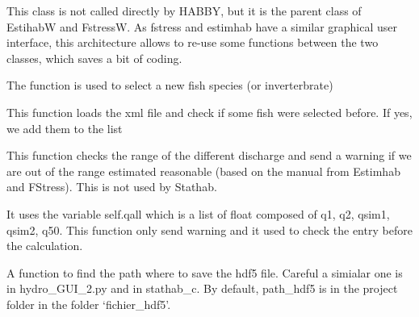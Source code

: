 \documentclass[letterpaper,10pt,english]{sphinxmanual}
\begin{document}
\begin{fulllineitems}
\label{\detokenize{index:src_GUI.estimhab_GUI.StatModUseful}}
This class is not called directly by HABBY, but it is the parent class of EstihabW and FstressW. As fstress and
estimhab have a similar graphical user interface, this architecture allows to re-use some functions between the
two classes, which saves a bit of coding.

\begin{fulllineitems}
\label{\detokenize{index:src_GUI.estimhab_GUI.StatModUseful.add_fish}}
The function is used to select a new fish species (or inverterbrate)

\end{fulllineitems}


\begin{fulllineitems}
\label{\detokenize{index:src_GUI.estimhab_GUI.StatModUseful.add_sel_fish}}
This function loads the xml file and check if some fish were selected before. If yes, we add them to the list

\end{fulllineitems}


\begin{fulllineitems}
\label{\detokenize{index:src_GUI.estimhab_GUI.StatModUseful.check_all_q}}
This function checks the range of the different discharge and send a warning if we are out of the range
estimated reasonable (based on the manual from Estimhab and FStress). This is not used by Stathab.

It uses the variable self.qall which is a list of float composed of q1, q2, qsim1, qsim2, q50. This function
only send warning and it used to check the entry before the calculation.

\end{fulllineitems}


\begin{fulllineitems}
\label{\detokenize{index:src_GUI.estimhab_GUI.StatModUseful.find_path_hdf5_est}}
A function to find the path where to save the hdf5 file. Careful a simialar one is in hydro\_GUI\_2.py and in
stathab\_c. By default, path\_hdf5 is in the project folder in the folder `fichier\_hdf5'.


\end{fulllineitems}
\end{fulllineitems}
\end{document}
